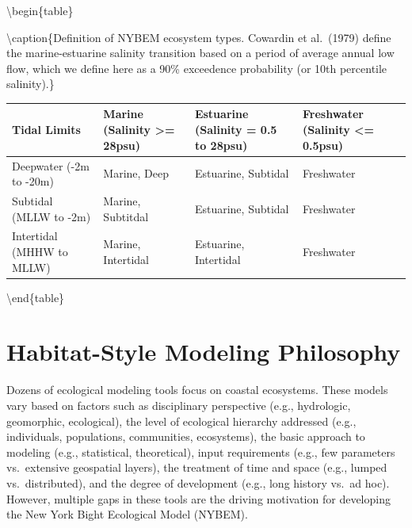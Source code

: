 \documentclass[
]{book}
\begin{document}
\textbackslash begin\{table\}

\textbackslash caption\{\label{tab:unnamed-chunk-7}Definition of NYBEM ecosystem types. Cowardin et al.~(1979) define the marine-estuarine salinity transition based on a period of average annual low flow, which we define here as a 90\% exceedence probability (or 10th percentile salinity).\}
\centering

\begin{tabular}[t]{l|l|l|l}
\hline
Tidal Limits & Marine (Salinity >= 28psu) & Estuarine (Salinity = 0.5 to 28psu) & Freshwater (Salinity <= 0.5psu)\\
\hline
Deepwater (-2m to -20m) & Marine, Deep & Estuarine, Subtidal & Freshwater\\
\hline
Subtidal (MLLW to -2m) & Marine, Subtitdal & Estuarine, Subtidal & Freshwater\\
\hline
Intertidal (MHHW to MLLW) & Marine, Intertidal & Estuarine, Intertidal & Freshwater\\
\hline
\end{tabular}

\textbackslash end\{table\}

\hypertarget{habitat-style-modeling-philosophy}{%
\section{Habitat-Style Modeling Philosophy}\label{habitat-style-modeling-philosophy}}

Dozens of ecological modeling tools focus on coastal ecosystems. These models vary based on factors such as disciplinary perspective (e.g., hydrologic, geomorphic, ecological), the level of ecological hierarchy addressed (e.g., individuals, populations, communities, ecosystems), the basic approach to modeling (e.g., statistical, theoretical), input requirements (e.g., few parameters vs.~extensive geospatial layers), the treatment of time and space (e.g., lumped vs.~distributed), and the degree of development (e.g., long history vs.~ad hoc). However, multiple gaps in these tools are the driving motivation for developing the New York Bight Ecological Model (NYBEM).
\end{document}
